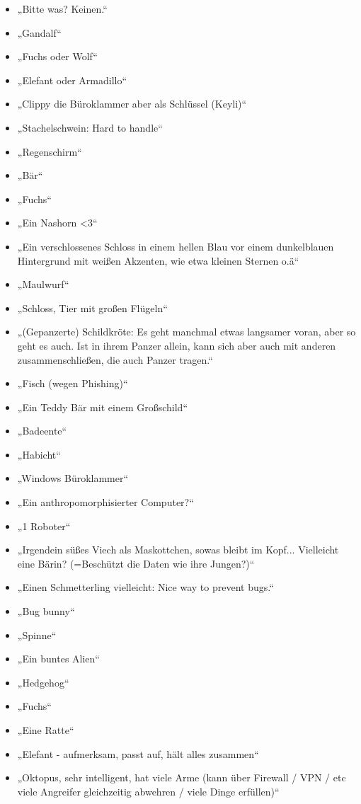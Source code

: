 \documentclass[german,report]{i1thesis}
\begin{document}
\begin{itemize}
    \item „Bitte was? Keinen.“
    \item „Gandalf“
    \item „Fuchs oder Wolf“
    \item „Elefant oder Armadillo“
    \item „Clippy die Büroklammer aber als Schlüssel (Keyli)“
    \item „Stachelschwein: Hard to handle“
    \item „Regenschirm“
    \item „Bär“
    \item „Fuchs“
    \item „Ein Nashorn <3“
    \item „Ein verschlossenes Schloss in einem hellen Blau vor einem dunkelblauen Hintergrund mit weißen Akzenten, wie etwa kleinen Sternen o.ä“
    \item „Maulwurf“
    \item „Schloss, Tier mit großen Flügeln“
    \item „(Gepanzerte) Schildkröte: Es geht manchmal etwas langsamer voran, aber so geht es auch. Ist in ihrem Panzer allein, kann sich aber auch mit anderen zusammenschließen, die auch Panzer tragen.“
    \item „Fisch (wegen Phishing)“
    \item „Ein Teddy Bär mit einem Großschild“
    \item „Badeente“
    \item „Habicht“
    \item „Windows Büroklammer“
    \item „Ein anthropomorphisierter Computer?“
    \item „1 Roboter“
    \item „Irgendein süßes Viech als Maskottchen, sowas bleibt im Kopf... Vielleicht eine Bärin? (=Beschützt die Daten wie ihre Jungen?)“
    \item „Einen Schmetterling vielleicht: Nice way to prevent bugs.“
    \item „Bug bunny“
    \item „Spinne“
    \item „Ein buntes Alien“
    \item „Hedgehog“
    \item „Fuchs“
    \item „Eine Ratte“
    \item „Elefant - aufmerksam, passt auf, hält alles zusammen“
    \item „Oktopus, sehr intelligent, hat viele Arme (kann über Firewall / VPN / etc viele Angreifer gleichzeitig abwehren / viele Dinge erfüllen)“

\end{itemize}
\end{document}

